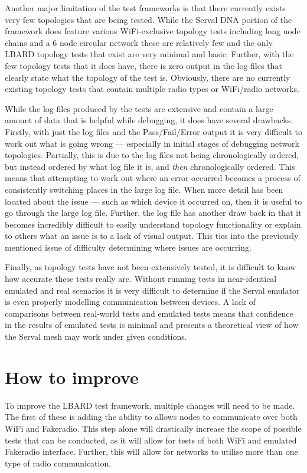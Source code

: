 Another major limitation of the test frameworks is that there currently exists very few topologies that are being tested.
While the Serval DNA portion of the framework does feature various WiFi-exclusive topology tests including long node chains and a 6 node circular network these are relatively few and the only LBARD topology tests that exist are very minimal and basic.
Further, with the few topology tests that it does have, there is zero output in the log files that clearly state what the topology of the test is. 
Obviously, there are no currently existing topology tests that contain multiple radio types or WiFi/radio networks.

While the log files produced by the tests are extensive and contain a large amount of data that is helpful while debugging, it does have several drawbacks. 
Firstly, with just the log files and the Pass/Fail/Error output it is very difficult to work out what is going wrong — especially in initial stages of debugging network topologies.
Partially, this is due to the log files not being chronologically ordered, but instead ordered by what log file it is, and \emph{then} chronologically ordered.
This means that attempting to work out where an error occurred becomes a process of consistently switching places in the large log file.
When more detail has been located about the issue — such as which device it occurred on, then it is useful to go through the large log file.
Further, the log file has another draw back in that it becomes incredibly difficult to easily understand topology functionality or explain to others what an issue is to a lack of visual output.
This ties into the previously mentioned issue of difficulty determining where issues are occurring.

Finally, as topology tests have not been extensively tested, it is difficult to know how accurate these tests really are.
Without running tests in near-identical emulated and real scenarios it is very difficult to determine if the Serval emulator is even properly modelling communication between devices. 
A lack of comparisons between real-world tests and emulated tests means that confidence in the results of emulated tests is minimal and presents a theoretical view of how the Serval mesh may work under given conditions. 


\section{How to improve}
To improve the LBARD test framework, multiple changes will need to be made.
The first of these is adding the ability to allows nodes to communicate over both WiFi and Fakeradio. 
This step alone will drastically increase the scope of possible tests that can be conducted, as it will allow for tests of both WiFi and emulated Fakeradio interface.
Further, this will allow for networks to utilise more than one type of radio communication.

